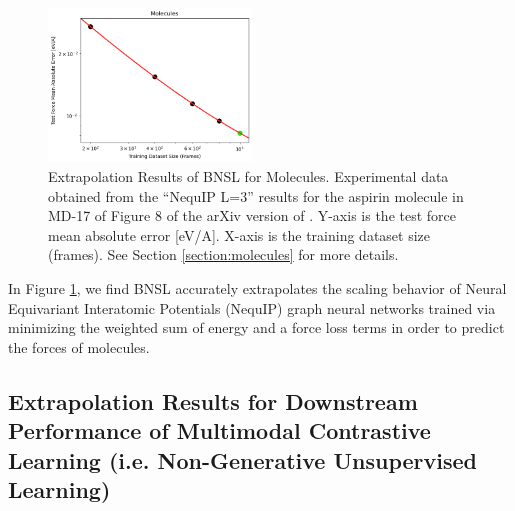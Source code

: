 \documentclass{article} %
\begin{document}
\begin{figure}[htbp]
    \centering
\includegraphics[width=0.48\textwidth]{figures/molecules/molecules.png}
    \caption{
Extrapolation Results of BNSL for Molecules. Experimental data obtained from the ``NequIP L=3'' results for the aspirin molecule in MD-17 of Figure 8 of the arXiv version of \cite{Batzner_2022}. Y-axis is the test force mean absolute error [eV/A]. X-axis is the training dataset size (frames). See Section \ref{section:molecules} for more details.
    }
    \label{fig:molecules}
\end{figure}

In Figure \ref{fig:molecules}, we find BNSL accurately extrapolates the scaling behavior of Neural Equivariant Interatomic Potentials (NequIP) graph neural networks \citep{Batzner_2022} trained via minimizing the weighted sum of energy and a force loss terms in order to predict the forces of molecules. 


\clearpage

\subsection{Extrapolation Results for Downstream Performance of Multimodal Contrastive Learning (i.e. Non-Generative Unsupervised Learning)}
\label{section:extrapolate_contrastive}
\end{document}
